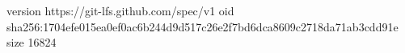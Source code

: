 version https://git-lfs.github.com/spec/v1
oid sha256:1704efe015ea0ef0ac6b244d9d517c26e2f7bd6dca8609c2718da71ab3cdd91e
size 16824
